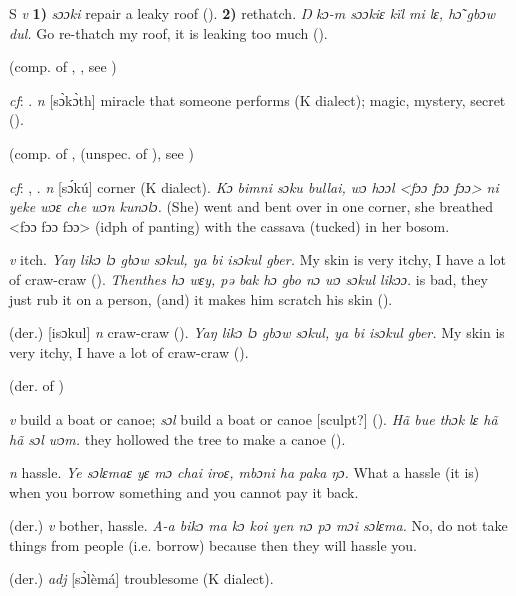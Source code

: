 \begin{letter}{S}
 \textit{v} \textbf{1)} \textit{sɔɔki} repair a leaky roof (\citealt{Pichl1967}). \textbf{2)} rethatch. \textit{Ŋ kɔ-m sɔɔkiɛ kïl mi lɛ, hɔ̃ gbɔw dul.} Go re-thatch my roof, it is leaking too much (\citealt{Pichl1967}). 

 (comp. of , , see ) 

 \textit{cf}: . \textit{n} [sɔ̀kɔ̀th] miracle that someone performs (K dialect); magic, mystery, secret (\citealt{Pichl1967}).

 (comp. of ,  (unspec. of ), see ) 

 \textit{cf}: , . \textit{n} [sɔ́kú] corner (K dialect). \textit{Kɔ bimni sɔku bullai, wɔ hɔɔl <fɔɔ fɔɔ fɔɔ> ni yeke wɔɛ che wɔn kunɔlɔ.} (She) went and bent over in one corner, she breathed <fɔɔ fɔɔ fɔɔ> (idph of panting) with the cassava (tucked) in her bosom.

 \textit{v} itch. \textit{Yaŋ likɔ lɔ gbɔw sɔkul, ya bi isɔkul gber.} My skin is very itchy, I have a lot of craw-craw (\citealt{Pichl1967}). \textit{Thenthes hɔ wɛy, pə bak hɔ gbo nɔ wɔ sɔkul likɔɔ.}  is bad, they just rub it on a person, (and) it makes him scratch his skin (\citealt{Pichl1967}). 

 (der.) [isɔkul] \textit{n} craw-craw (\citealt{Pichl1967}). \textit{Yaŋ likɔ lɔ gbɔw sɔkul, ya bi isɔkul gber.} My skin is very itchy, I have a lot of craw-craw (\citealt{Pichl1967}). 

 (der. of ) 

 \textit{v} build a boat or canoe; \textit{sɔl} build a boat or canoe [sculpt?] (\citealt{Pichl1967}). \textit{Hã bue thɔk lɛ hã hã sɔl wɔm.} they hollowed the tree to make a canoe (\citealt{Pichl1967}). 

 \textit{n} hassle. \textit{Ye sɔlɛmaɛ yɛ mɔ chai iroɛ, mbɔni ha paka ŋɔ.} What a hassle (it is) when you borrow something and you cannot pay it back.

 (der.) \textit{v} bother, hassle. \textit{A-a bikɔ ma kɔ koi yen nɔ pɔ mɔi sɔlɛma.} No, do not take things from people (i.e. borrow) because then they will hassle you. 

 (der.) \textit{adj} [sɔ̀lèmá] troublesome (K dialect). 


\end{letter}
